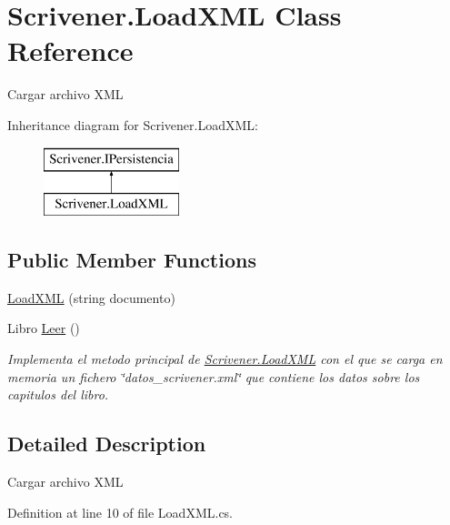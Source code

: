 \hypertarget{class_scrivener_1_1_load_x_m_l}{\section{Scrivener.\-Load\-X\-M\-L Class Reference}
\label{class_scrivener_1_1_load_x_m_l}
}


Cargar archivo X\-M\-L  


Inheritance diagram for Scrivener.\-Load\-X\-M\-L\-:\begin{figure}[H]
\begin{center}
\leavevmode
\includegraphics[height=2.000000cm]{class_scrivener_1_1_load_x_m_l}
\end{center}
\end{figure}
\subsection*{Public Member Functions}
\begin{DoxyCompactItemize}
\item 
\hyperlink{class_scrivener_1_1_load_x_m_l_aaac25883a7f3f34e585973ceff34238d}{Load\-X\-M\-L} (string documento)
\item 
Libro \hyperlink{class_scrivener_1_1_load_x_m_l_ae5c0e87f3f365e244d01376501347f6e}{Leer} ()
\begin{DoxyCompactList}\small\item\em Implementa el metodo principal de \hyperlink{class_scrivener_1_1_load_x_m_l}{Scrivener.\-Load\-X\-M\-L} con el que se carga en memoria un fichero \char`\"{}datos\-\_\-scrivener.\-xml\char`\"{} que contiene los datos sobre los capitulos del libro. \end{DoxyCompactList}\end{DoxyCompactItemize}


\subsection{Detailed Description}
Cargar archivo X\-M\-L 



Definition at line 10 of file Load\-X\-M\-L.\-cs.



